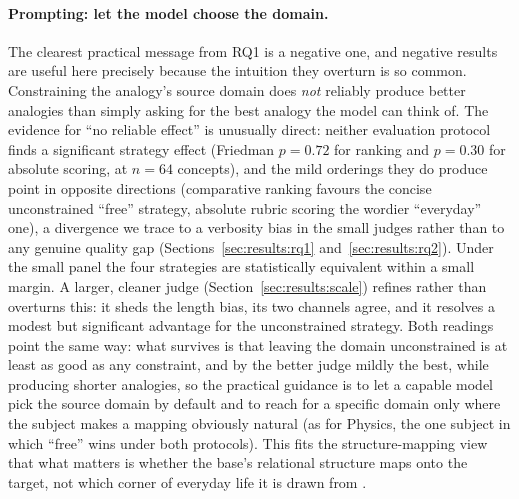 \documentclass[11pt]{article}
\begin{document}
\paragraph{Prompting: let the model choose the domain.}
The clearest practical message from RQ1 is a negative one, and negative results are useful
here precisely because the intuition they overturn is so common. Constraining the analogy's
source domain does \emph{not} reliably produce better analogies than simply asking for the
best analogy the model can think of. The evidence for ``no reliable effect'' is unusually
direct: neither evaluation protocol finds a significant strategy effect (Friedman $p = 0.72$
for ranking and $p = 0.30$ for absolute scoring, at $n = 64$ concepts), and the mild orderings
they do produce point in opposite directions (comparative ranking favours the concise
unconstrained ``free'' strategy, absolute rubric scoring the wordier ``everyday'' one), a
divergence we trace to a verbosity bias in the small judges rather than to any genuine
quality gap (Sections~\ref{sec:results:rq1} and~\ref{sec:results:rq2}). Under the small panel
the four strategies are statistically equivalent within a small margin. A larger, cleaner judge
(Section~\ref{sec:results:scale}) refines rather than overturns this: it sheds the length bias,
its two channels agree, and it resolves a modest but significant advantage for the unconstrained
strategy. Both readings point the same way: what survives is that
leaving the domain unconstrained is at least as good as any constraint, and by the better judge
mildly the best, while producing shorter analogies, so the practical guidance is to let a capable model pick the source domain
by default and to reach for a specific domain only where the subject makes a mapping obviously
natural (as for Physics, the one subject in which ``free'' wins under both protocols). This
fits the structure-mapping view that what matters is whether the base's relational structure
maps onto the target, not which corner of everyday life it is drawn from
\citep{gentner1983structure}.
\end{document}
